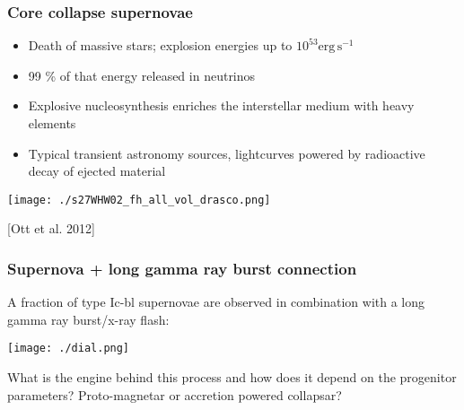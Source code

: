 \begin{frame}
\frametitle{Core collapse supernovae}
\hspace{-0.5cm}
\begin{minipage}[]{0.45\textwidth}
\begin{itemize}
\item Death of massive stars; explosion energies up to $10^{53} \mathrm{erg\, s^{-1}}$
\item 99 \% of that energy released in neutrinos
\item Explosive nucleosynthesis enriches the interstellar medium with heavy elements
\item Typical transient astronomy sources, lightcurves powered by radioactive decay of ejected material  
\end{itemize}
\end{minipage}
\hspace{0.5cm}
\begin{minipage}[]{0.4\textwidth}
\begin{minipage}[]{\textwidth}
\texttt{[image: ./s27WHW02\_fh\_all\_vol\_drasco.png]}
\end{minipage}

\begin{minipage}[]{\textwidth}
\small [Ott et al. 2012]
\end{minipage}
\end{minipage}

\end{frame}

\begin{frame}
\frametitle{Supernova + long gamma ray burst connection}
\begin{minipage}[]{0.45\textwidth}
A fraction of type Ic-bl supernovae are observed in combination with a long gamma ray burst/x-ray flash: 
\end{minipage} 
\hspace{0.5cm}
\vspace{0.5cm}
\begin{minipage}[]{0.45\textwidth}
\begin{minipage}[]{\textwidth}
\texttt{[image: ./dial.png]}
\end{minipage}
\end{minipage}

\vspace{0.5cm}
\begin{minipage}[]{\textwidth}
What is the engine behind this process and how does it depend on the progenitor parameters? Proto-magnetar or accretion powered collapsar?
\end{minipage}
\end{frame}

